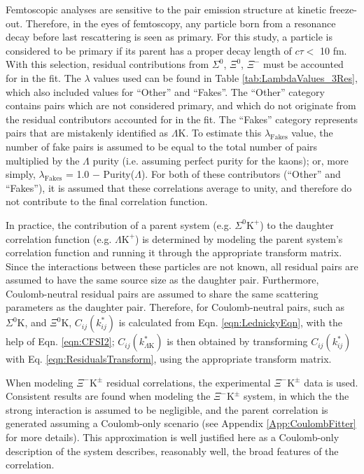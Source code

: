 \documentclass[ALICE,manyauthors]{cernphprep}
\newcommand{\Lam}{$\Lambda$\xspace}
\newcommand{\KchP}{$\mathrm{K^{+}}$\xspace}
\newcommand{\LamK}{$\Lambda$K\xspace}
\newcommand{\LamKchP}{$\Lambda\mathrm{K^{+}}$\xspace}
\newcommand{\XiKpm}{$\Xi^{-}\mathrm{K^{\pm}}$\xspace}
\begin{document}
Femtoscopic analyses are sensitive to the pair emission structure at kinetic freeze-out.
Therefore, in the eyes of femtoscopy, any particle born from a resonance decay before last rescattering is seen as primary.
For this study, a particle is considered to be primary if its parent has a proper decay length of $c\tau <$ 10 fm. 
With this selection, residual contributions from $\Sigma^{0}$, $\Xi^{0}$, $\Xi^{-}$ must be accounted for in the fit.
The $\lambda$ values used can be found in Table \ref{tab:LambdaValues_3Res}, which also included values for ``Other'' and ``Fakes''.  
The ``Other'' category contains pairs which are not considered primary, and which do not originate from the residual contributors accounted for in the fit.  
The ``Fakes'' category represents pairs that are mistakenly identified as \LamK.  
To estimate this $\lambda_{\mathrm{Fakes}}$ value, the number of fake pairs is assumed to be equal to the total number of pairs multiplied by the \Lam purity (i.e. assuming perfect purity for the kaons); or, more simply, $\lambda_{\mathrm{Fakes}}$ = 1.0 $-$ Purity(\Lam).  
For both of these contributors (``Other'' and ``Fakes''), it is assumed that these correlations average to unity, and therefore do not contribute to the final correlation function.

In practice, the contribution of a parent system (e.g. $\Sigma^{0}$\KchP) to the daughter correlation function (e.g. \LamKchP) is determined by modeling the parent system's correlation function and running it through the appropriate transform matrix.
Since the interactions between these particles are not known, all residual pairs are assumed to have the same source size as the daughter pair.
Furthermore, Coulomb-neutral residual pairs are assumed to share the same scattering parameters as the daughter pair.
Therefore, for Coulomb-neutral pairs, such as $\Sigma^{0}$K, and $\Xi^{0}$K, $C_{ij}(k^{*}_{ij})$ is calculated from Eqn. \ref{eqn:LednickyEqn}, with the help of Eqn. \ref{eqn:CFSI2}; $C_{ij}(k^{*}_{\Lambda\mathrm{K}})$ is then obtained by transforming $C_{ij}(k^{*}_{ij})$ with Eq. \ref{eqn:ResidualsTransform}, using the appropriate transform matrix.  

When modeling \XiKpm residual correlations, the experimental \XiKpm data is used. 
Consistent results are found when modeling the \XiKpm system, in which the the strong interaction is assumed to be negligible, and the parent correlation is generated assuming a Coulomb-only scenario (see Appendix \ref{App:CoulombFitter} for more details).
This approximation is well justified here as a Coulomb-only description of the system describes, reasonably well, the broad features of the correlation.   
\end{document}
